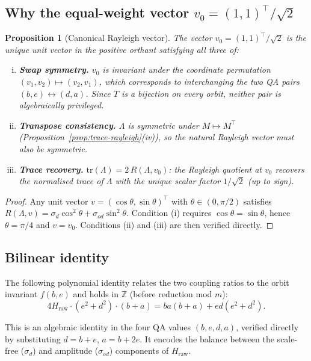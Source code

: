 \documentclass[11pt]{article}
\newtheorem{proposition}[theorem]{Proposition}
\theoremstyle{definition}
\theoremstyle{remark}
\newcommand{\hraw}{H_{\mathrm{raw}}}
\begin{document}
\subsection{Why the equal-weight vector $v_0=(1,1)^\top/\sqrt{2}$}

\begin{proposition}[Canonical Rayleigh vector]
\label{prop:v0}
The vector $v_0=(1,1)^\top/\sqrt{2}$ is the unique unit vector in the positive
orthant satisfying all three of:
\begin{enumerate}[(i)]
  \item \textbf{Swap symmetry.} $v_0$ is invariant under the coordinate permutation
    $(v_1,v_2)\mapsto(v_2,v_1)$, which corresponds to interchanging the two QA
    pairs $(b,e)\leftrightarrow(d,a)$.  Since $T$ is a bijection on every orbit,
    neither pair is algebraically privileged.
  \item \textbf{Transpose consistency.} $\Lambda$ is symmetric under $M\mapsto M^\top$
    (Proposition~\ref{prop:trace-rayleigh}(iv)), so the natural Rayleigh vector
    must also be symmetric.
  \item \textbf{Trace recovery.} $\mathrm{tr}(\Lambda)=2\,R(\Lambda,v_0)$:
    the Rayleigh quotient at $v_0$ recovers the normalised trace of $\Lambda$
    with the unique scalar factor $1/\sqrt{2}$ (up to sign).
\end{enumerate}
\end{proposition}

\begin{proof}
Any unit vector $v=(\cos\theta,\sin\theta)^\top$ with $\theta\in(0,\pi/2)$ satisfies
$R(\Lambda,v)=\sigma_d\cos^2\theta+\sigma_{od}\sin^2\theta$.
Condition (i) requires $\cos\theta=\sin\theta$, hence $\theta=\pi/4$ and
$v=v_0$.  Conditions (ii) and (iii) are then verified directly.
\end{proof}

\subsection{Bilinear identity}

The following polynomial identity relates the two coupling ratios to the orbit
invariant $f(b,e)$ and holds in $\mathbb{Z}$ (before reduction mod $m$):
\begin{equation}
  \label{eq:bilinear}
  4\hraw\cdot(e^2+d^2)\cdot(b+a) = ba(b+a) + ed(e^2+d^2).
\end{equation}

This is an algebraic identity in the four QA values $(b,e,d,a)$, verified
directly by substituting $d=b+e$, $a=b+2e$.  It encodes the balance between
the scale-free ($\sigma_d$) and amplitude ($\sigma_{od}$) components of $\hraw$.
\end{document}
